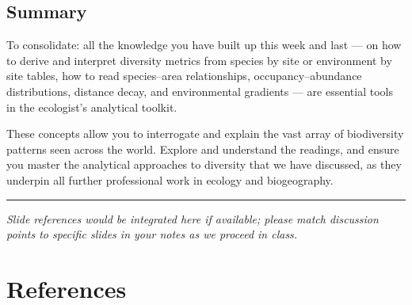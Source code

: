 \documentclass[
  10pt,
]{book}
\begin{document}
\section{Summary}\label{summary}

To consolidate: all the knowledge you have built up this week and last
--- on how to derive and interpret diversity metrics from species by
site or environment by site tables, how to read species--area
relationships, occupancy--abundance distributions, distance decay, and
environmental gradients --- are essential tools in the ecologist's
analytical toolkit.

These concepts allow you to interrogate and explain the vast array of
biodiversity patterns seen across the world. Explore and understand the
readings, and ensure you master the analytical approaches to diversity
that we have discussed, as they underpin all further professional work
in ecology and biogeography.

\begin{center}\rule{0.5\linewidth}{0.5pt}\end{center}

\emph{Slide references would be integrated here if available; please
match discussion points to specific slides in your notes as we proceed
in class.}

\chapter*{References}\label{references}
\end{document}
